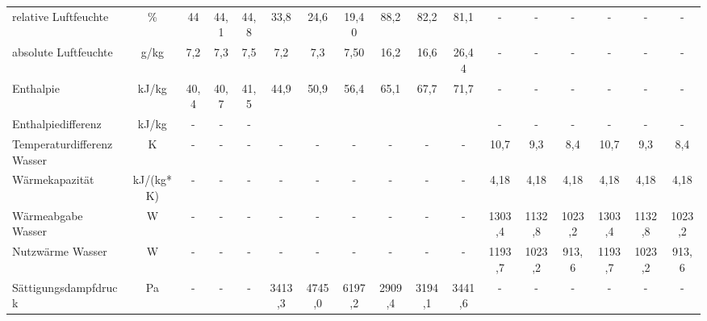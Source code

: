 \begin{table}[h!]
{\begin{tabular}{l|c|c|c|c|c|c|c|c|c|c|c|c|c|c|c|c}
				relative Luftfeuchte & \%    & \multicolumn{1}{c|}{44} & \multicolumn{1}{c|}{44,1} & \multicolumn{1}{c|}{44,8} & 33,8  & 24,6  & 19,40 & 88,2  & 82,2  & 81,1  & -     & -     & -     & -     & -     & - \\
				absolute Luftfeuchte & g/kg  & \multicolumn{1}{c|}{7,2} & \multicolumn{1}{c|}{7,3} & \multicolumn{1}{c|}{7,5} & 7,2   & 7,3   & 7,50  & 16,2  & 16,6  & 26,44 & -     & -     & -     & -     & -     & - \\
				Enthalpie & kJ/kg & \multicolumn{1}{c|}{40,4} & \multicolumn{1}{c|}{40,7} & \multicolumn{1}{c|}{41,5} & 44,9  & 50,9  & 56,4  & 65,1  & 67,7  & 71,7  & -     & -     & -     & -     & -     & - \\
				Enthalpiedifferenz & kJ/kg & -     & -     & -     & \multicolumn{4}{c|}{}          &       &       & -     & -     & -     & -     & -     & - \\
				\hline
				Temperaturdifferenz  Wasser & K     & -     & -     & -     & \multicolumn{1}{c|}{-} & \multicolumn{1}{c|}{-} & \multicolumn{1}{c|}{-} & \multicolumn{1}{c|}{-} & \multicolumn{1}{c|}{-} & \multicolumn{1}{c|}{-} & \multicolumn{1}{c|}{10,7} & \multicolumn{1}{c|}{9,3} & \multicolumn{1}{c|}{8,4} & \multicolumn{1}{c|}{10,7} & 9,3   & 8,4 \\
				Wärmekapazität & kJ/(kg*K) & -     & -     & -     & \multicolumn{1}{c|}{-} & \multicolumn{1}{c|}{-} & \multicolumn{1}{c|}{-} & \multicolumn{1}{c|}{-} & \multicolumn{1}{c|}{-} & \multicolumn{1}{c|}{-} & \multicolumn{1}{c|}{4,18} & \multicolumn{1}{c|}{4,18} & \multicolumn{1}{c|}{4,18} & \multicolumn{1}{c|}{4,18} & 4,18  & 4,18 \\
				Wärmeabgabe Wasser & W     & -     & -     & -     & \multicolumn{1}{c|}{-} & \multicolumn{1}{c|}{-} & \multicolumn{1}{c|}{-} & \multicolumn{1}{c|}{-} & \multicolumn{1}{c|}{-} & \multicolumn{1}{c|}{-} & \multicolumn{1}{c|}{1303,4} & \multicolumn{1}{c|}{1132,8} & \multicolumn{1}{c|}{1023,2} & \multicolumn{1}{c|}{1303,4} & 1132,8 & 1023,2 \\
				Nutzwärme Wasser & W     & -     & -     & -     & \multicolumn{1}{c|}{-} & \multicolumn{1}{c|}{-} & \multicolumn{1}{c|}{-} & \multicolumn{1}{c|}{-} & \multicolumn{1}{c|}{-} & \multicolumn{1}{c|}{-} & \multicolumn{1}{c|}{1193,7} & \multicolumn{1}{c|}{1023,2} & \multicolumn{1}{c|}{913,6} & \multicolumn{1}{c|}{1193,7} & 1023,2 & 913,6 \\
				\hline
				Sättigungsdampfdruck & Pa    & -     & -     & -     & 3413,3 & 4745,0 & 6197,2 & 2909,4 & 3194,1 & 3441,6 & -     & -     & -     & -     & -     & - \\

\end{tabular}}
\end{table}
